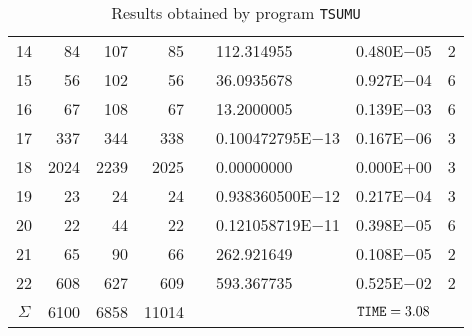\documentclass{esub2acm}
\begin{document}
\begin{table}
\begin{tabular}{c|rrrr@{}lcc}
14  &   84  &   107 &   85  &       &   112.314955  &   0.480E$-$05 &   2   \\
15  &   56  &   102 &   56  &       &   36.0935678  &   0.927E$-$04 &   6   \\
16  &   67  &   108 &   67  &       &   13.2000005  &   0.139E$-$03 &   6   \\
17  &   337 &   344 &   338 &       &   0.100472795E$-$13   &   0.167E$-$06 &   3   \\
18  &   2024    &   2239    &   2025    &       &   0.00000000   &   0.000E+00 &   3   \\
19  &   23  &   24  &   24  &       &   0.938360500E$-$12   &   0.217E$-$04 &   3   \\
20  &   22  &   44  &   22  &       &   0.121058719E$-$11   &   0.398E$-$05 &   6   \\
21  &   65  &   90  &   66  &       &   262.921649  &   0.108E$-$05 &   2   \\
22  &   608 &   627 &   609 &       &   593.367735  &   0.525E$-$02 &   2   \\ \hline
$\Sigma$\rule[-2pt]{0pt}{12pt}  &   6100    &   6858    &   11014   &       &       &   ${\tt TIME} = 3.08$ &       \\ \hline
\end{tabular}
\caption{Results obtained by program {\tt TSUMU}}
\label{tsumu}
\end{table}

\clearpage
\end{document}
